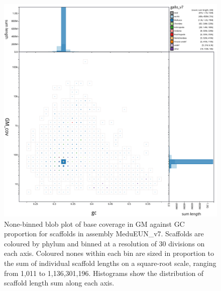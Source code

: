 \documentclass[11pt, a4paper]{article}
\begin{document}
\begin{figure}
	\includegraphics[width=\linewidth]{figures/btk_blob_MgalMED_v7}
	\caption{None-binned blob plot of base coverage in GM against GC proportion for scaffolds in assembly MeduEUN\_v7. Scaffolds are coloured by phylum and binned at a resolution of 30 divisions on each axis. Coloured nones within each bin are sized in proportion to the sum of individual scaffold lengths on a square-root scale, ranging from 1,011 to 1,136,301,196. Histograms show the distribution of scaffold length sum along each axis.}
	\label{supfig:btk-blob-MeduEUN}
\end{figure}
\end{document}
